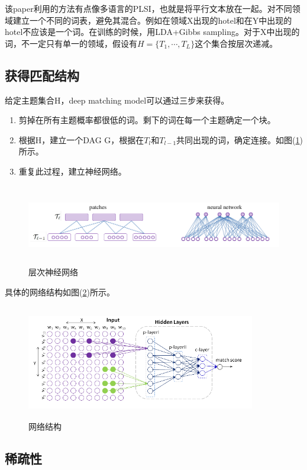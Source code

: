 \documentclass[12pt,a4paper,titlepage]{article}
\begin{document}
该paper利用的方法有点像多语言的PLSI，也就是将平行文本放在一起。对不同领域建立一个不同的词表，避免其混合。例如在领域X出现的hotel和在Y中出现的hotel不应该是一个词。在训练的时候，用LDA+Gibbs sampling。对于X中出现的词，不一定只有单一的领域，假设有$H=\{T_1,\cdots ,T_L\}$这个集合按层次递减。

\subsection{获得匹配结构}

给定主题集合H，deep matching model可以通过三步来获得。
\begin{enumerate}
\item 剪掉在所有主题概率都很低的词。剩下的词在每一个主题确定一个块。
\item 根据H，建立一个DAG G，根据在$T_l 和T_{l-1}$共同出现的词，确定连接。如图(\ref{fig:hir})所示。
\item 重复此过程，建立神经网络。
\end{enumerate}

\begin{figure}
  \centering
  \includegraphics[height=3.5cm,width=14cm]{hir.png}
  \caption{层次神经网络}
  \label{fig:hir}
\end{figure}

具体的网络结构如图(\ref{fig:jiegou})所示。

\begin{figure}
  \centering
  \includegraphics[height=5cm,width=10cm]{jiegou.png}
  \caption{网络结构}
  \label{fig:jiegou}
\end{figure}

\subsection{稀疏性}
\end{document}
